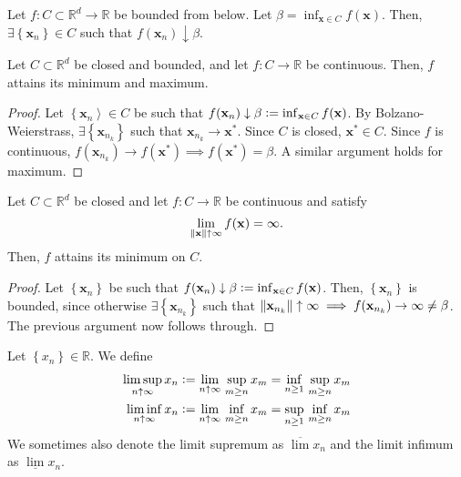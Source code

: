 \begin{prop}
    Let $f \colon C \subset \mathbb{R}^d \to \mathbb{R}$ be bounded from below. Let $\beta = \inf_{\mathbf{x} \in C} f(\mathbf{x})$. Then, $\exists \left\{ \mathbf{x}_n \right\} \in C$ such that $f(\mathbf{x}_n) \downarrow \beta$.  
\end{prop}

\begin{thm}
    Let $C \subset \mathbb{R}^d$ be closed and bounded, and let $f \colon C \to \mathbb{R}$ be continuous. Then, $f$ attains its minimum and maximum. 
\end{thm}
\begin{proof}
    Let $\left\{ \mathbf{x}_n \right\rangle \in C$ be such that $f(\mathbf{x}_n) \downarrow \beta \vcentcolon= \inf_{\mathbf{x} \in C} f(\mathbf{x})$. By Bolzano-Weierstrass, $\exists \left\{ \mathbf{x}_{n_k} \right\}$ such that $\mathbf{x}_{n_k} \to \mathbf{x}^*$. Since $C$ is closed, $\mathbf{x}^* \in C$. Since $f$ is continuous, $f(\mathbf{x}_{n_k}) \to f(\mathbf{x}^*) \implies f(\mathbf{x}^*) = \beta$. A similar argument holds for maximum.
\end{proof}

\begin{cor}
    Let $C \subset \mathbb{R}^d$ be closed and let $f \colon C \to \mathbb{R}$ be continuous and satisfy 
    \[
        \lim_{\norm{\mathbf{x}} \uparrow \infty} f(\mathbf{x}) = \infty.
    \]
    Then, $f$ attains its minimum on $C$. 
\end{cor}
\begin{proof}
    Let $\left\{ \mathbf{x}_n \right\}$ be such that $f(\mathbf{x}_n) \downarrow \beta \vcentcolon= \inf_{\mathbf{x} \in C} f(\mathbf{x})$. Then, $\left\{ \mathbf{x}_n \right\}$ is bounded, since otherwise $\exists \left\{ \mathbf{x}_{n_k} \right\}$ such that $\norm{\mathbf{x}_{n_k}} \uparrow \infty \implies f(\mathbf{x}_{n_k}) \to \infty \neq \beta$. The previous argument now follows through.
\end{proof}

\begin{defn}
    Let $\left\{ x_n \right\} \in \mathbb{R}$. We define
    \begin{align*}
        \limsup_{n \uparrow \infty} x_n &\vcentcolon= \lim_{n \uparrow \infty} \, \sup_{m \geq n} x_m = \inf_{n \geq 1} \, \sup_{m \geq n} x_m \\
        \liminf_{n \uparrow \infty} x_n &\vcentcolon= \lim_{n \uparrow \infty} \, \inf_{m \geq n} x_m = \sup_{n \geq 1} \, \inf_{m \geq n} x_m
    \end{align*}
    We sometimes also denote the limit supremum as $\overline{\lim} x_n$ and the limit infimum as $\underline{\lim} x_n$.
\end{defn}

